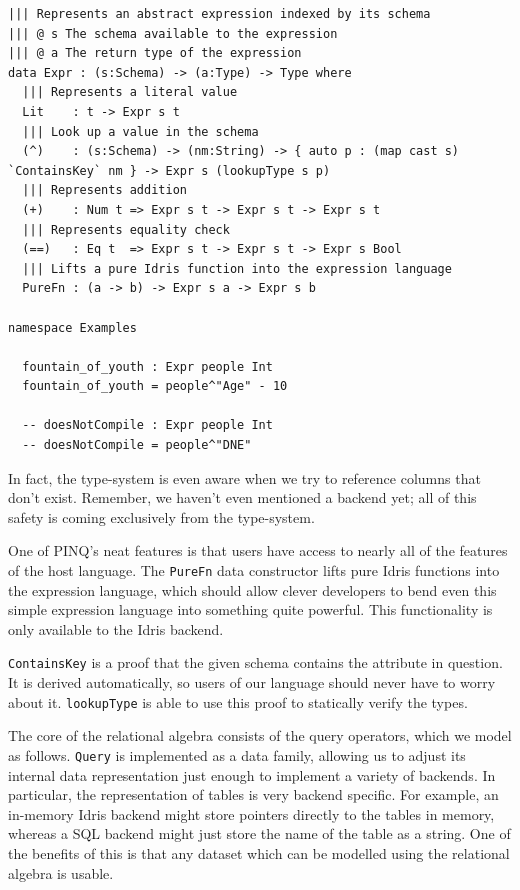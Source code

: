 \documentclass[12pt]{article}
\begin{document}
\begin{lstlisting}
||| Represents an abstract expression indexed by its schema
||| @ s The schema available to the expression
||| @ a The return type of the expression
data Expr : (s:Schema) -> (a:Type) -> Type where
  ||| Represents a literal value
  Lit    : t -> Expr s t
  ||| Look up a value in the schema
  (^)    : (s:Schema) -> (nm:String) -> { auto p : (map cast s) `ContainsKey` nm } -> Expr s (lookupType s p)
  ||| Represents addition
  (+)    : Num t => Expr s t -> Expr s t -> Expr s t
  ||| Represents equality check
  (==)   : Eq t  => Expr s t -> Expr s t -> Expr s Bool
  ||| Lifts a pure Idris function into the expression language
  PureFn : (a -> b) -> Expr s a -> Expr s b

namespace Examples

  fountain_of_youth : Expr people Int
  fountain_of_youth = people^"Age" - 10

  -- doesNotCompile : Expr people Int
  -- doesNotCompile = people^"DNE"
\end{lstlisting}

In fact, the type-system is even aware when we try to reference columns that don't exist.
Remember, we haven't even mentioned a backend yet; all of this safety is coming exclusively from the type-system.

One of PINQ's neat features is that users have access to nearly all of the features of the host language.
The \texttt{PureFn} data constructor lifts pure Idris functions into the expression language, which should allow clever developers to bend even this simple expression language into something quite powerful.
This functionality is only available to the Idris backend.

\texttt{ContainsKey} is a proof that the given schema contains the attribute in question.
It is derived automatically, so users of our language should never have to worry about it.
\texttt{lookupType} is able to use this proof to statically verify the types.

The core of the relational algebra consists of the query operators, which we model as follows.
\texttt{Query} is implemented as a data family, allowing us to adjust its internal data representation just enough to implement a variety of backends.
In particular, the representation of tables is very backend specific.
For example, an in-memory Idris backend might store pointers directly to the tables in memory, whereas a SQL backend might just store the name of the table as a string.
One of the benefits of this is that any dataset which can be modelled using the relational algebra is usable.
\end{document}
